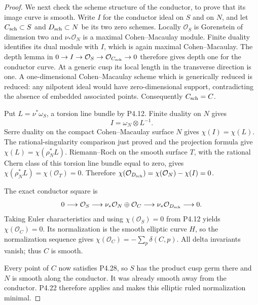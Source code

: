 \begin{proof}
We next check the scheme structure
of the conductor, to prove that
its image curve is smooth.
Write $I$ for the conductor ideal
on $S$ and on $N$, and let
$C_{\rm sch}\subset S$ and
$D_{\rm sch}\subset N$ be its
two zero schemes. Locally
$\mathcal O_S$ is Gorenstein
of dimension two and
$\nu_*\mathcal O_N$ is a
maximal Cohen--Macaulay module.
Finite duality identifies
its dual module with $I$,
which is again maximal
Cohen--Macaulay. The depth
lemma in
$0\to I\to\mathcal O_S
\to\mathcal O_{C_{\rm sch}}\to0$
therefore gives depth one
for the conductor curve.
At a generic cusp its local
length in the transverse
direction is one. A
one-dimensional Cohen--Macaulay
scheme which is generically
reduced is reduced: any
nilpotent ideal would have
zero-dimensional support,
contradicting the absence of
embedded associated points.
Consequently $C_{\rm sch}=C$.

Put $L=\nu^*\omega_S$, a
torsion line bundle by P4.12.
Finite duality on $N$ gives
\[
 I=\omega_N\otimes L^{-1}.
\]
Serre duality on the compact
Cohen--Macaulay surface $N$
gives $\chi(I)=\chi(L)$.
The rational-singularity
comparison just proved and
the projection formula give
$\chi(L)=\chi(\rho_N^*L)$.
Riemann--Roch on the smooth
surface $T$, with the rational
Chern class of this torsion
line bundle equal to zero,
gives $\chi(\rho_N^*L)
=\chi(\mathcal O_T)=0$.
Therefore
$\chi(\mathcal O_{D_{\rm sch}})
=\chi(\mathcal O_N)-\chi(I)=0$.

The exact conductor square is
\[
 0\longrightarrow\mathcal O_S
 \longrightarrow
 \nu_*\mathcal O_N\oplus\mathcal O_C
 \longrightarrow\nu_*\mathcal O_{D_{\rm sch}}
 \longrightarrow0.
\]
Taking Euler characteristics and
using $\chi(\mathcal O_S)=0$
from P4.12 yields
$\chi(\mathcal O_C)=0$.
Its normalization is the
smooth elliptic curve $H$,
so the normalization sequence
gives $\chi(\mathcal O_C)
 =-\sum_p\delta(C,p)$.
All delta invariants vanish;
thus $C$ is smooth.

Every point of $C$ now satisfies
P4.28, so $S$ has the product
cusp germ there and $N$ is
smooth along the conductor.
It was already smooth away
from the conductor. P4.22
therefore applies and makes
this elliptic ruled
normalization minimal.
\end{proof}

